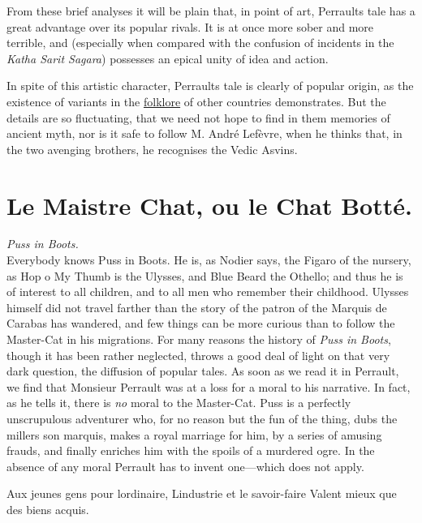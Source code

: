 \documentclass[14pt,a4paper]{memoir}
\newcommand{\ul}[1]{\uline{#1}}
\newcommand{\notesection}[1]{%
  \addtonotes{\protect\par\protect\vspace{2ex}\protect\noindent\textbf{#1}\protect\par\protect\vspace{1ex}}%
}
\begin{document}
{From these brief analyses it will be plain that, in point of art,
Perrault\textquotesingle s tale has a great advantage over its popular
rivals. It is at once more sober and more terrible, and (especially when
compared with the confusion of incidents in the \emph{Katha Sarit
Sagara}) possesses an epical unity of idea and action.

In spite of this artistic character, Perrault\textquotesingle s tale is
clearly of popular origin, as the existence of variants in the
\ul{folklore} of other countries demonstrates. But the details are so
fluctuating, that we need not hope to find in them memories of ancient
myth, nor is it safe to follow M. André Lefèvre, when he thinks that, in
the two avenging brothers, he recognises the Vedic Asvins.

\section{Le Maistre Chat, ou le Chat Botté.}
\notesection{Le Maistre Chat, ou le Chat Botté.}


\emph{Puss in Boots.} \\

Everybody knows Puss in Boots. He is, as Nodier says, the Figaro of the
nursery, as Hop o\textquotesingle{} My Thumb is the Ulysses, and Blue
Beard the Othello; and thus he is of interest to all children, and to
all men who remember their childhood. Ulysses himself did not travel
farther than the story of the patron of the Marquis de Carabas has
wandered, and few things can be more curious than to follow the
Master-Cat in his migrations. For many reasons the history of \emph{Puss
in Boots}, though it has been rather neglected, throws a good deal of
light on that very dark question, the diffusion of popular tales. As
soon as we read it in Perrault, we find that Monsieur Perrault was at a
loss for a moral to his narrative. In fact, as he tells it, there is
\emph{no} moral to the Master-Cat. Puss is a perfectly unscrupulous
adventurer who, for no reason but the fun of the thing, dubs the
miller\textquotesingle s son marquis, makes a royal marriage for him, by
a series of amusing frauds, and finally enriches him with the spoils of
a murdered ogre. In the absence of any moral Perrault has to invent
one---which does not apply.

{\textquotesingle Aux jeunes gens pour l\textquotesingle ordinaire,}
{L\textquotesingle industrie et le savoir-faire} {Valent mieux que des
biens acquis.\textquotesingle{}}

}
\end{document}
